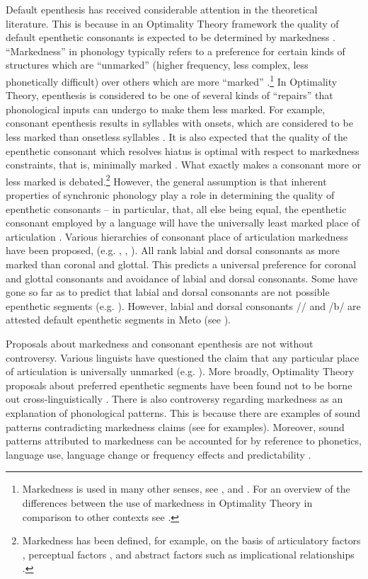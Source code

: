 \documentclass[output=paper]{langscibook}
\begin{document}
Default epenthesis has received considerable attention in the theoretical literature. 
This is because in an Optimality Theory framework
the quality of default epenthetic consonants is
expected to be determined by markedness \citep{mcpr94,lo02,dl06}.  
``Markedness'' in phonology typically refers to a preference for 
certain kinds of structures which are ``unmarked'' (higher frequency, less complex, less phonetically difficult) over others
which are more ``marked'' \citep{mc02,dl06}.\footnote{%
		Markedness is used in many 
		other senses, see \citet{ha06}, \citet{by11} and \citet{hu11}. 
		For an overview of the differences between 
		the use of markedness in Optimality Theory in comparison to other contexts
		see \citet[15]{mc02}.}
In Optimality Theory, epenthesis is considered to be one of several kinds of ``repairs'' that 
phonological inputs can undergo to make them less marked.
For example, consonant epenthesis results in syllables with onsets,
which are considered to be less marked than onsetless syllables \citep{dl06}.
It  is also expected that the quality of the epenthetic consonant which 
resolves hiatus is optimal with
respect to markedness constraints, that is, minimally marked \citep{lo02,dl06,ca11}. 
What exactly makes a consonant more or less marked is debated.\footnote{%
		Markedness has been defined, for example,
		on the basis of articulatory factors \citep{arpu94},
		perceptual factors \citep{st09},
		and abstract factors such as implicational relationships \citep[15]{mc02}.}
 However, the general assumption is that inherent properties of
synchronic phonology play a role in determining the quality of epenthetic consonants
 -- in particular, that, all else being equal,
the epenthetic consonant employed by a language
will have the universally least marked place of articulation \citep{lo02,bl08,ca11}. 
Various hierarchies of consonant place of articulation markedness have been proposed, 
(e.g. \citealt{ke75,papr91}, \citealt[4]{lo02}, \citealt[2]{dl06}).
All rank labial and dorsal consonants as more marked than coronal and glottal.
This predicts a universal preference for coronal and glottal consonants and 
avoidance of labial and dorsal consonants.
Some have gone so far as to predict that labial and  dorsal consonants 
are not  possible epenthetic segments (e.g. \citealt[82]{dl06}). 
However, labial and  dorsal consonants /\gw/ and \mbox{/b/} are attested 
default epenthetic segments in Meto (see ). 

Proposals about markedness and consonant epenthesis 
are not without controversy. 
Various linguists have questioned the claim that any
particular place of articulation is universally unmarked (e.g. \citealp{hu03,ri07,ri11}).
More broadly, Optimality Theory proposals about preferred epenthetic segments 
have been found not to be borne out cross-linguistically \citep{mo15,vasa17}.  
There is also controversy regarding markedness
as an explanation  of phonological patterns.
This is because there are examples of sound patterns
contradicting markedness claims (see \citealt[183]{hu05} for examples).
Moreover, sound patterns attributed to markedness
can be accounted for by reference to phonetics,
language use, language change \citep{by01,by11,bl04}   
or frequency effects and predictability \citep{hu05}. 
\end{document}
